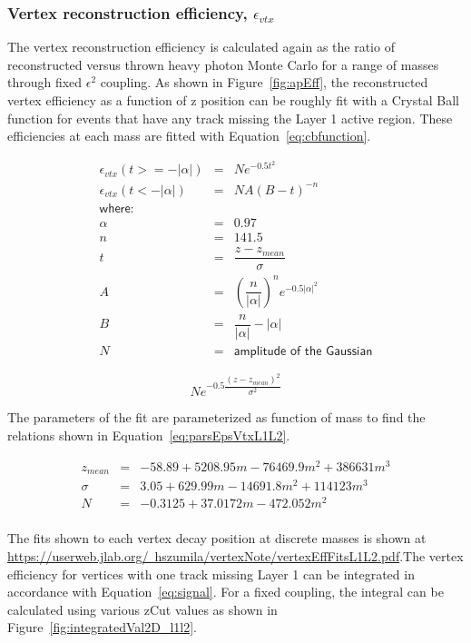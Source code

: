 \documentclass[twoside]{article}
\begin{document}
\subsubsection{Vertex reconstruction efficiency, $\epsilon_{vtx}$}

The vertex reconstruction efficiency is calculated again as the ratio of reconstructed versus thrown heavy photon Monte Carlo for a range of masses through fixed $\epsilon^{2}$ coupling. As shown in Figure~\ref{fig:apEff}, the reconstructed vertex efficiency as a function of z position can be roughly fit with a Crystal Ball function for events that have any track missing the Layer 1 active region. These efficiencies at each mass are fitted with Equation~\eqref{eq:cbfunction}.


\begin{eqnarray*}
\label{eq:cbfunction}
\epsilon_{vtx}(t >= -| \alpha |) & = & N e^{-0.5t^{2}}\\
\epsilon_{vtx}(t < -| \alpha |) & = & N A(B-t)^{-n}\\
\textsf{where:}\\
\alpha & = & 0.97\\
n & = & 141.5\\
t & = & \dfrac{z-z_{mean}}{\sigma}\\
A & = & (\dfrac{n}{| \alpha |})^{n}e^{-0.5 |\alpha |^2}\\
B & = & \dfrac{n}{| \alpha |}-|\alpha | \\
N & = & \textsf{amplitude of the Gaussian}
\end{eqnarray*}


\begin{equation}
\label{eq:gausfunction}
Ne^{-0.5\dfrac{(z-z_{mean})^2}{\sigma^2}}
\end{equation}

The parameters of the fit are parameterized as  function of mass to find the relations shown in Equation~\eqref{eq:parsEpsVtxL1L2}.

\begin{eqnarray*}
\label{eq:parsEpsVtxL1L2}
z_{mean} & = & -58.89+5208.95m-76469.9m^2+386631m^3\\
\sigma & = & 3.05+629.99m-14691.8m^2+114123m^3\\
N & = & -0.3125+37.0172m-472.052m^2 \\
\end{eqnarray*}

The fits shown to each vertex decay position at discrete masses is shown at  \href{url}{https://userweb.jlab.org/~hszumila/vertexNote/vertexEffFitsL1L2.pdf}.The vertex efficiency for vertices with one track missing Layer 1 can be integrated in accordance with Equation~\eqref{eq:signal}. For a fixed coupling, the integral can be calculated using various zCut values as shown in Figure~\ref{fig:integratedVal2D_l1l2}.
\end{document}

